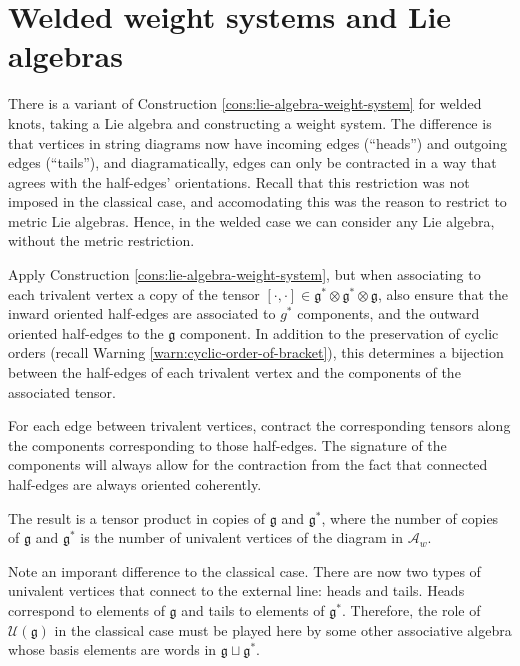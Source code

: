 \section{Welded weight systems and Lie algebras}
\label{sec:welded-weight-systems-and-lie-algebras}

There is a variant of Construction \ref{cons:lie-algebra-weight-system} for welded knots, taking a Lie algebra and constructing a weight system. The difference is that vertices in string diagrams now have incoming edges (``heads'') and outgoing edges (``tails''), and diagramatically, edges can only be contracted in a way that agrees with the half-edges' orientations. Recall that this restriction was not imposed in the classical case, and accomodating this was the reason to restrict to metric Lie algebras. Hence, in the welded case we can consider any Lie algebra, without the metric restriction.

\begin{construction}
	\label{cons:lie-algebra-weight-system-welded}
	Apply Construction \ref{cons:lie-algebra-weight-system}, but when associating to each trivalent vertex a copy of the tensor \([\cdot, \cdot] \in \mathfrak{g}^{\ast} \otimes \mathfrak{g}^{\ast} \otimes \mathfrak{g}\), also ensure that the inward oriented half-edges are associated to \(g^{\ast}\) components, and the outward oriented half-edges to the \(\mathfrak{g}\) component. In addition to the preservation of cyclic orders (recall Warning \ref{warn:cyclic-order-of-bracket}), this determines a bijection between the half-edges of each trivalent vertex and the components of the associated tensor.

	For each edge between trivalent vertices, contract the corresponding tensors along the components corresponding to those half-edges. The signature of the components will always allow for the contraction from the fact that connected half-edges are always oriented coherently.

	The result is a tensor product in copies of \(\mathfrak{g}\) and \(\mathfrak{g}^{\ast}\), where the number of copies of \(\mathfrak{g}\) and \(\mathfrak{g}^{\ast}\) is the number of univalent vertices of the diagram in \(\mathcal{A}_{w}\).
\end{construction}

Note an imporant difference to the classical case. There are now two types of univalent vertices that connect to the external line: heads and tails. Heads correspond to elements of \(\mathfrak{g}\) and tails to elements of \(\mathfrak{g}^{\ast}\). Therefore, the role of \(\mathcal{U}(\mathfrak{g})\) in the classical case must be played here by some other associative algebra whose basis elements are words in \(\mathfrak{g} \sqcup \mathfrak{g}^{\ast}\).

